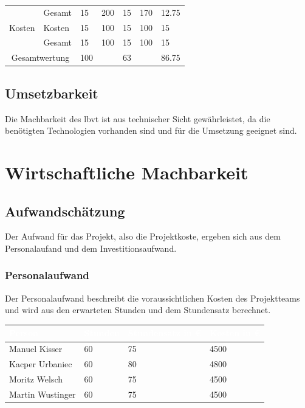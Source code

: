 \begin{tabular}{| p{2.2cm} |  p{2.2cm} | p{1.4cm} |  p{1.4cm} | p{1.4cm} | p{1.4cm} | p{1.4cm} | }
        \cline{2 -7}
        \cellcolor{gray} &\cellcolor{lightgray}\color{white}Gesamt & \cellcolor{lightgray}\color{white}15 & \cellcolor{lightgray}\color{white}200 & \cellcolor{lightgray}\color{white}15 & \cellcolor{lightgray}\color{white}170 & \cellcolor{lightgray}\color{white}12.75\\
        \cline{2 -7}
        \cellcolor{gray}\color{white}Kosten&\cellcolor{lightgray}\color{white}Kosten & 15 & 100 & 15 & 100 & 15 \\
        \cline{2 -7}
        \cellcolor{gray} &\cellcolor{lightgray}\color{white}Gesamt & \cellcolor{lightgray}\color{white}15 & \cellcolor{lightgray}\color{white}100 & \cellcolor{lightgray}\color{white}15 & \cellcolor{lightgray}\color{white}100 & \cellcolor{lightgray}\color{white}15\\
        \cline{2 -7}
        \multicolumn{2}{|c|}{\cellcolor{gray}\color{white}Gesamtwertung} & 100 & \multicolumn{2}{|r|}{63} & \multicolumn{2}{|r|}{86.75}\\
        \hline
    \end{tabular}

\subsection{Umsetzbarkeit}
Die Machbarkeit des \gls{lbvt} ist aus technischer Sicht gewährleistet, da die benötigten Technologien vorhanden sind und für die Umsetzung geeignet sind.
\section{Wirtschaftliche Machbarkeit}
\subsection{Aufwandschätzung}
Der Aufwand für das Projekt, also die Projektkoste, ergeben sich aus dem Personalaufand und dem Investitionsaufwand.
\subsubsection{Personalaufwand}
Der Personalaufwand beschreibt die voraussichtlichen Kosten des Projektteams und wird aus den erwarteten Stunden und dem Stundensatz berechnet.\\
\begin{center}
    \begin{tabular}{| l | l | l | l |}
        \hline \rowcolor{gray} \textbf{\textcolor{white}{Person}} & \textbf{\textcolor{white}{Stunden}} & \textbf{\textcolor{white}{Stundensatz in €}}& \textbf{\textcolor{white}{Kosten in €}}\\
        \hline
        Manuel Kisser& 60 & 75 & 4500\\
        \hline
        Kacper Urbaniec& 60 & 80 & 4800\\
        \hline
        Moritz Welsch& 60 & 75 & 4500\\
        \hline
        Martin Wustinger& 60 & 75 & 4500\\
        \hline
    \end{tabular}
\end{center}
